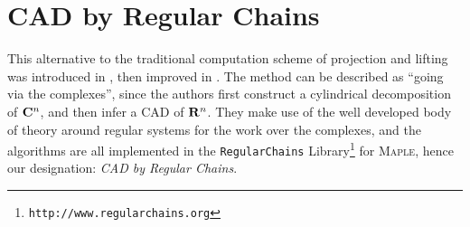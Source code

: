 \documentclass[runningheads,a4paper]{llncs}
\begin{document}
\section{CAD by Regular Chains}
\label{sec:RC}

This alternative to the traditional computation scheme of projection and lifting was introduced in \cite{Chenetal2009d}, then improved in \cite{ChenMorenoMaza2012a}.  The method can be described as ``going via the complexes'', since the authors first construct a cylindrical decomposition of ${\mathbf C}^n$, and then infer a CAD of ${\mathbf R}^n$.  They make use of the well developed body of theory around regular systems \cite{Wang2000} for the work over the complexes, and the algorithms are all implemented in the \texttt{RegularChains} Library\footnote{\texttt{http://www.regularchains.org}} for \textsc{Maple}, hence our designation: \emph{CAD by Regular Chains}.
\end{document}
